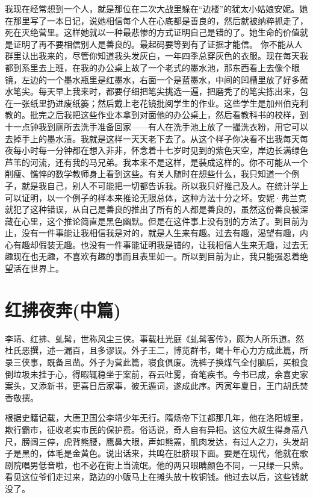 我现在经常想到一个人，就是那位在二次大战里躲在“边楼”的犹太小姑娘安妮。她在那里写了一本日记，说她相信每个人在心底都是善良的，然后就被纳粹抓走了，死在灭绝营里。这样她就以一种最悲惨的方式证明自己是错的了。她生命的价值就是证明了再不要相信别人是善良的。最起码要等到有了证据才能信。 你不能从人群里认出我来的，尽管你知道我头发灰白，一年四季总穿灰色的衣服。现在每天我都到系里去上班，在我的办公桌上故了一个老式的墨水池，那东西看上去像个眼镜，左边的一个墨水瓶里是红墨水，右面一个是蓝墨水，中间的凹槽里放了好多蘸水笔尖。每天早上我来时，都要仔细把笔尖挑选一遍，把磨秃了的笔尖拣出来，包在一张纸里扔进废纸篓；然后戴上老花镜批阅学生的作业。这些学生是加州伯克利教的。批完之后我把这些作业本拿到对面他的办公桌上，然后看教科书的校样，到十一点钟我到厕所去洗手准备回家——有人在洗手池上放了一撮洗衣粉，用它可以去掉手上的墨水渍。我就是这样一天天老下去了。从这个样子你决看不出我每天每夜每小时每一分钟都在想入非非，怀念着十七岁时见到的紫色天空，岸边长满绿色芦苇的河流，还有我的马兄弟。我本来不是这样，是装成这样的。你不可能从一个削瘦、憔悴的数学教师身上看到这些。有关人随时在想些什么，我只知道一个例子，就是我自己，别人不可能把一切都告诉我。所以我只好推己及人。在统计学上可以证明，以一个例子的样本来推论无限总体，这种方法十分之坏。安妮·弗兰克就犯了这种错误，从自己是善良的推出了所有的人都是善良的，虽然这份善良被深藏在心里，这个推论简直是黑色幽默。但是在这件事上没有别的方法了。到目前为止，没有一件事能让我相信我是对的，就是人生来有趣。过去有趣，渴望有趣，内心有趣却假装无趣。也没有一件事能证明我是错的，让我相信人生来无趣，过去无趣现在也无趣，不喜欢有趣的事而且表里如一。所以到目前为止，我只能强忍着绝望活在世界上。

\chapter{红拂夜奔(中篇)}

李靖、红拂、虬髯，世称风尘三侠。事载杜光庭《虬髯客传》，颇为人所乐道。然杜氏恶撰，述一漏百，且多谬误。外子王二，博览群书，竭十年心力方成此篇，所录三侠事，既备且凿。外子为营此篇，寝食俱废。洗裤子换煤气全付脑后，买粮食倒垃圾未挂于心，得暇辄稳坐于案前，吞云吐雾，奋笔疾书。今书已成，余喜史家案头，又添新书，更喜日后家事，彼无遁词，遂成此序。丙寅年夏日，王门胡氏焚香敬撰。

根据史籍记载，大唐卫国公李靖少年无行。隋炀帝下江都那几年，他在洛阳城里，欺行霸市，征收老实市民的保护费。俗话说，奇人自有异相。这位大叔生得身高八尺，膀阔三停，虎背熊腰，鹰鼻大眼，声如熊罴，肌肉发达，有过人之力，头发胡子是黑的，体毛是金黄色。说出话来，共鸣在肚脐眼下面。要是在现代，他就在歌剧院唱男低音啦，也不必在街上当流氓。他的两只眼睛颜色不同，一只绿一只紫。看见这位爷们走过来，路边的小贩马上在摊头放十枚铜钱。他过去以后，这些钱就没了。

